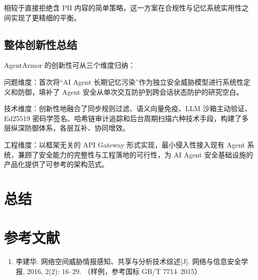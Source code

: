\documentclass[UTF8,zihao=-4,oneside,fontset=none]{ctexrep}
\begin{document}
	相较于直接拒绝含 PII 内容的简单策略，这一方案在合规性与记忆系统实用性之间实现了更精细的平衡。
	
	\section{整体创新性总结}
	AgentArmor 的创新性可从三个维度归纳：
	
	问题维度：首次将“AI Agent 长期记忆污染”作为独立安全威胁模型进行系统性定义和防御，填补了 Agent 安全从单次交互防护到跨会话状态防护的研究空白。
	
	技术维度：创新性地融合了同步规则过滤、语义向量免疫、LLM 沙箱主动验证、Ed25519 密码学签名、哈希链审计追踪和后台周期扫描六种技术手段，构建了多层纵深防御体系，各层互补、协同增效。
	
	工程维度：以框架无关的 API Gateway 形式实现，最小侵入性接入现有 Agent 系统，兼顾了安全能力的完整性与工程落地的可行性，为 AI Agent 安全基础设施的产品化提供了可参考的架构范式。
	
	\chapter{总结}
	
	\chapter*{参考文献}
	\begin{enumerate}[label={\lbrack\arabic*\rbrack},leftmargin=2em,itemsep=0pt]
		\item 李建华. 网络空间威胁情报感知、共享与分析技术综述[J]. 网络与信息安全学报, 2016, 2(2): 16--29. （样例，参考国标 GB/T 7714--2015）
	\end{enumerate}
	
\end{document}
